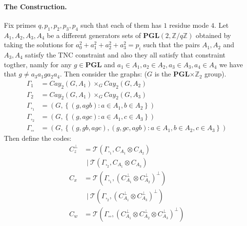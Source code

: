 \documentclass{article}
\begin{document}
\begin{multicols*}{2}
  \paragraph{The Construction.} Fix primes $q,p_1,p_2,p_3,p_4$ such that each of them has $1 $ residue mode $4$. Let $A_{1},A_{2},A_{3},A_{4}$ be a different generators sets of $ \mathbf{PGL}(2 , \mathbb{Z} / q\mathbb{Z} )  $ 
  obtained by taking the solutions for $a_{0}^{2} + a_{1}^{2} +a_{2}^{2} +a_{3}^{2} = p_i $ such that the pairs $A_{1},A_{2}$ and $A_{3},A_{4}$ satisfy the 
  TNC constraint and also they all satisfy that constraint togther, namly for any $g \in \mathbf{PGL}$  and $a_{1}\in A_{1}, a_{2} \in A_{2}, a_{3} \in A_{3}, a_{4} \in A_{4}$ we have that $ g \neq a_{3}a_{1}ga_{2}a_{4}$. Then consider the graphs: ($G$ is the \textbf{PGL}$\times \mathbb{Z}_2$ group).  
  \begin{equation*}
    \begin{split}
      \Gamma_{1}  &= Cay_{2}\left(  G, A_{1} \right)\times_{G} Cay_{2}\left(  G, A_{2} \right) \\
      \Gamma_{2}  &= Cay_{2}\left(  G, A_{1} \right)\times_{G} Cay_{2}\left(  G, A_{3} \right) \\
      \Gamma_{\square_{1}} &= \left( G, \left\{ \left( g, agb \right) : a \in A_{1}, b \in A_{2} \right\}  \right) \\
      \Gamma_{\square_{2}} &= \left( G, \left\{ \left( g, agc \right) : a \in A_{1}, c \in A_{3} \right\}  \right) \\
      \Gamma_{\square \square} &= \left( G, \left\{ \left( g, gb, agc \right), \left( g, gc, agb \right) :
      a \in A_{1}, b \in A_{2}, c \in A_{3} \right\}  \right) 
    \end{split}
  \end{equation*}
   Then define the codes:
	\begin{equation*}
	  \begin{split}
	    C_{z}^{\perp} & = \mathcal{T}\left( \Gamma_{\square_{1}}, C_{A_1} \otimes  C_{A_2}  \right) \\
	    & \ \ | \ \mathcal{T}\left(  \Gamma_{\square_{2}}, C_{A_1} \otimes C_{A_3}  \right) \\
	    C_{x} &=  \mathcal{T}\left(  \Gamma_{\square_{1}}, \left(  C_{A_1}^{\perp} \otimes C_{A_2}^{\perp} \right)^{\perp}  \right) \\
	    & \ \ | \ \mathcal{T}\left( \Gamma_{\square_{2}}, \left(  C_{A_1}^{\perp} \otimes C_{A_3}^{\perp} \right)^{\perp}  \right) \\
	    C_{w} &=  \mathcal{T}\left( \Gamma_{\square \square}, \left(  C_{A_1}^{\perp} \otimes C_{A_2}^{\perp} \otimes C_{A_3}^{\perp} \right)^{\perp}  \right)   

\end{split}
\end{equation*}
\end{multicols*}
\end{document}
